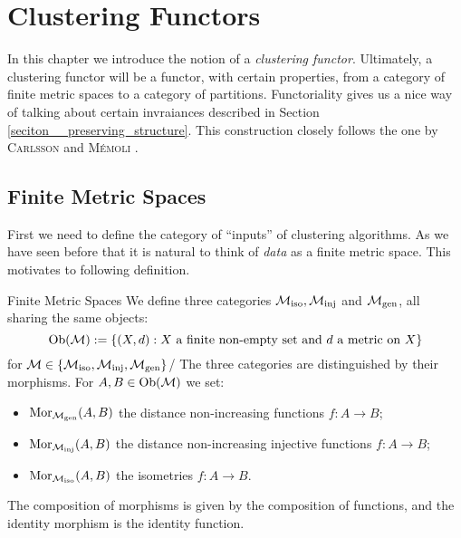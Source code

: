 \chapter{Clustering Functors}
\label{chapter__clustering_functor}

In this chapter we introduce the notion of a \emph{clustering functor}.
Ultimately, a clustering functor will be a functor, with certain properties, from a category of finite metric spaces to a category of partitions. Functoriality gives us a nice way of talking about certain invraiances described in Section \ref{seciton__preserving_structure}.
This construction closely follows the one by \textsc{Carlsson} and \textsc{M\'emoli} \cite{Carlsson2010}.

\section{Finite Metric Spaces}
\label{section__finite_metric_spaces}

First we need to define the category of ``inputs'' of clustering algorithms. As we have seen before that it is natural to think of \emph{data} as a finite metric space. This motivates to following definition.

\begin{definition}{Finite Metric Spaces \cite[Sec.~3.2]{Carlsson2010}}{}
We define three categories ${\mathcal{M}_\mathrm{iso}}, {\mathcal{M}_\mathrm{inj}}$ and ${\mathcal{M}_\mathrm{gen}}$, all sharing the same objects:
\begin{equation*}
\mathrm {Ob}(\mathcal{M}) := \{(X,d): \text{$X$ a finite non-empty set and $d$ a metric on $X$}\}
\end{equation*}
for $\mathcal{M} \in \{{\mathcal{M}_\mathrm{iso}}, {\mathcal{M}_\mathrm{inj}}, {\mathcal{M}_\mathrm{gen}}\}$/
The three categories are distinguished by their morphisms. For $A, B \in \mathrm {Ob}(\mathcal{M})$ we set:
\begin{itemize}
    \item $\mathrm {Mor}_{\mathcal{M}_\mathrm{gen}}(A,B)$ the distance non-increasing functions $f\colon A \to B$;
    \item $\mathrm {Mor}_{\mathcal{M}_\mathrm{inj}}(A,B)$ the distance non-increasing injective functions $f\colon A \to B$;
    \item $\mathrm {Mor}_{\mathcal{M}_\mathrm{iso}}(A,B)$ the isometries $f\colon A \to B$.
\end{itemize}
The composition of morphisms is given by the composition of functions, and the identity morphism is the identity function.
\end{definition}

